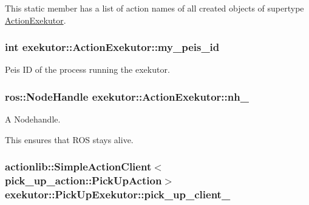 \-This static member has a list of action names of all created objects of supertype \hyperlink{classexekutor_1_1ActionExekutor}{\-Action\-Exekutor}. 

\hypertarget{classexekutor_1_1ActionExekutor_a31644a88e4d0166c2d3a70bab9eb5b99}{
\subsubsection[{my\-\_\-peis\-\_\-id}]{\setlength{\rightskip}{0pt plus 5cm}int {\bf exekutor\-::\-Action\-Exekutor\-::my\-\_\-peis\-\_\-id}}}\label{classexekutor_1_1ActionExekutor_a31644a88e4d0166c2d3a70bab9eb5b99}


\-Peis \-I\-D of the process running the exekutor. 

\hypertarget{classexekutor_1_1ActionExekutor_a1f0541608c4f27f3c72ab22b1874c882}{
\subsubsection[{nh\-\_\-}]{\setlength{\rightskip}{0pt plus 5cm}ros\-::\-Node\-Handle {\bf exekutor\-::\-Action\-Exekutor\-::nh\-\_\-}}}\label{classexekutor_1_1ActionExekutor_a1f0541608c4f27f3c72ab22b1874c882}


\-A \-Nodehandle. 

\-This ensures that \-R\-O\-S stays alive. \hypertarget{classexekutor_1_1PickUpExekutor_a49a101b883854d2fd5200dae5277125b}{
\subsubsection[{pick\-\_\-up\-\_\-client\-\_\-}]{\setlength{\rightskip}{0pt plus 5cm}actionlib\-::\-Simple\-Action\-Client$<$pick\-\_\-up\-\_\-action\-::\-Pick\-Up\-Action$>$ {\bf exekutor\-::\-Pick\-Up\-Exekutor\-::pick\-\_\-up\-\_\-client\-\_\-}}}\label{classexekutor_1_1PickUpExekutor_a49a101b883854d2fd5200dae5277125b}


